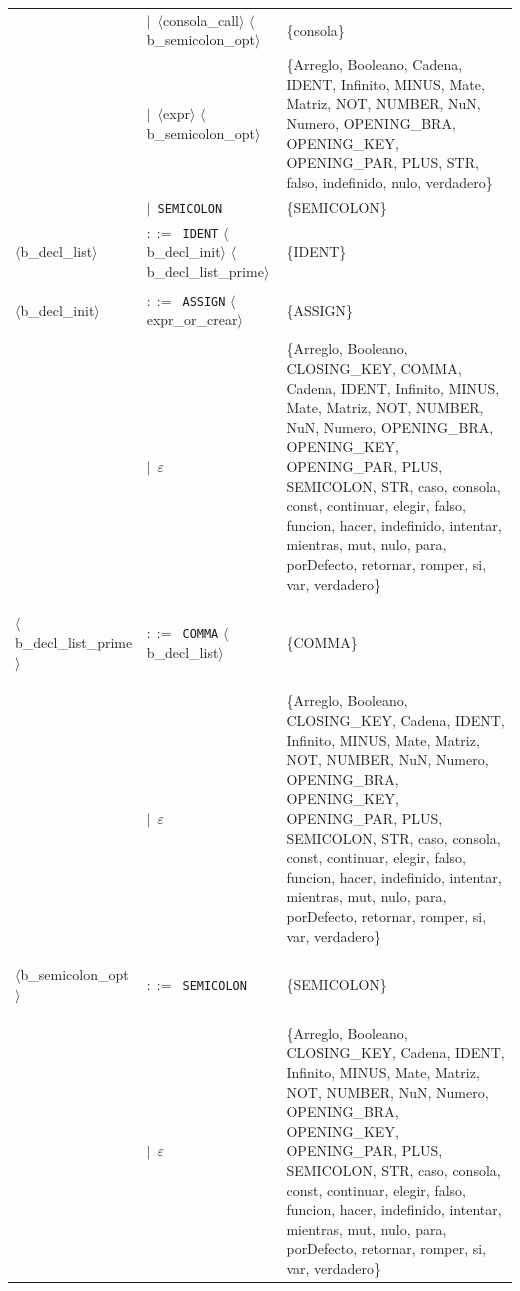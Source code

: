 \documentclass[10pt]{article}
\begin{document}
{\begin{longtable}{@{} p{2.0cm} p{6.9cm} p{6.9cm} @{}}
   & $\mid$~$\langle$consola\_call$\rangle$ $\langle$b\_semicolon\_opt$\rangle$ & \{consola\} \\
   & $\mid$~$\langle$expr$\rangle$ $\langle$b\_semicolon\_opt$\rangle$ & \{Arreglo, Booleano, Cadena, IDENT, Infinito, MINUS, Mate, Matriz, NOT, NUMBER, NuN, Numero, OPENING\_BRA, OPENING\_KEY, OPENING\_PAR, PLUS, STR, falso, indefinido, nulo, verdadero\} \\
   & $\mid$~\texttt{SEMICOLON} & \{SEMICOLON\} \\
  \midrule
  \textcolor{ntcolor}{\parbox[t]{1.8cm}{\raggedright$\langle$b\_\allowbreak{}decl\_\allowbreak{}list$\rangle$}} & $::=$~\texttt{IDENT} $\langle$b\_decl\_init$\rangle$ $\langle$b\_decl\_list\_prime$\rangle$ & \{IDENT\} \\
  \midrule
  \textcolor{ntcolor}{\parbox[t]{1.8cm}{\raggedright$\langle$b\_\allowbreak{}decl\_\allowbreak{}init$\rangle$}} & $::=$~\texttt{ASSIGN} $\langle$expr\_or\_crear$\rangle$ & \{ASSIGN\} \\
   & $\mid$~$\varepsilon$ & \{Arreglo, Booleano, CLOSING\_KEY, COMMA, Cadena, IDENT, Infinito, MINUS, Mate, Matriz, NOT, NUMBER, NuN, Numero, OPENING\_BRA, OPENING\_KEY, OPENING\_PAR, PLUS, SEMICOLON, STR, caso, consola, const, continuar, elegir, falso, funcion, hacer, indefinido, intentar, mientras, mut, nulo, para, porDefecto, retornar, romper, si, var, verdadero\} \\
  \midrule
  \textcolor{ntcolor}{\parbox[t]{1.8cm}{\raggedright$\langle$b\_\allowbreak{}decl\_\allowbreak{}list\_\allowbreak{}prime$\rangle$}} & $::=$~\texttt{COMMA} $\langle$b\_decl\_list$\rangle$ & \{COMMA\} \\
   & $\mid$~$\varepsilon$ & \{Arreglo, Booleano, CLOSING\_KEY, Cadena, IDENT, Infinito, MINUS, Mate, Matriz, NOT, NUMBER, NuN, Numero, OPENING\_BRA, OPENING\_KEY, OPENING\_PAR, PLUS, SEMICOLON, STR, caso, consola, const, continuar, elegir, falso, funcion, hacer, indefinido, intentar, mientras, mut, nulo, para, porDefecto, retornar, romper, si, var, verdadero\} \\
  \midrule
  \textcolor{ntcolor}{\parbox[t]{1.8cm}{\raggedright$\langle$b\_\allowbreak{}semicolon\_\allowbreak{}opt$\rangle$}} & $::=$~\texttt{SEMICOLON} & \{SEMICOLON\} \\
   & $\mid$~$\varepsilon$ & \{Arreglo, Booleano, CLOSING\_KEY, Cadena, IDENT, Infinito, MINUS, Mate, Matriz, NOT, NUMBER, NuN, Numero, OPENING\_BRA, OPENING\_KEY, OPENING\_PAR, PLUS, SEMICOLON, STR, caso, consola, const, continuar, elegir, falso, funcion, hacer, indefinido, intentar, mientras, mut, nulo, para, porDefecto, retornar, romper, si, var, verdadero\} \\

\end{longtable}}
\end{document}
